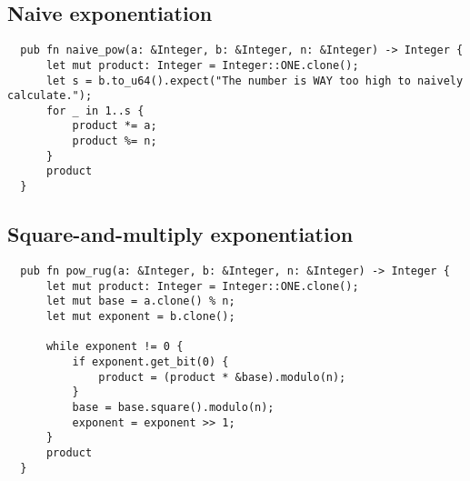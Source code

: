 \subsection{Naive exponentiation}
\label{sec:naive_exp}

\begin{verbatim}
  pub fn naive_pow(a: &Integer, b: &Integer, n: &Integer) -> Integer {
      let mut product: Integer = Integer::ONE.clone();
      let s = b.to_u64().expect("The number is WAY too high to naively calculate.");
      for _ in 1..s {
          product *= a;
          product %= n;
      }
      product
  }
\end{verbatim}

\subsection{Square-and-multiply exponentiation}
\label{sec:exp}

\begin{verbatim}
  pub fn pow_rug(a: &Integer, b: &Integer, n: &Integer) -> Integer {
      let mut product: Integer = Integer::ONE.clone();
      let mut base = a.clone() % n;
      let mut exponent = b.clone();

      while exponent != 0 {
          if exponent.get_bit(0) {
              product = (product * &base).modulo(n);
          }
          base = base.square().modulo(n);
          exponent = exponent >> 1;
      }
      product
  }
\end{verbatim}
